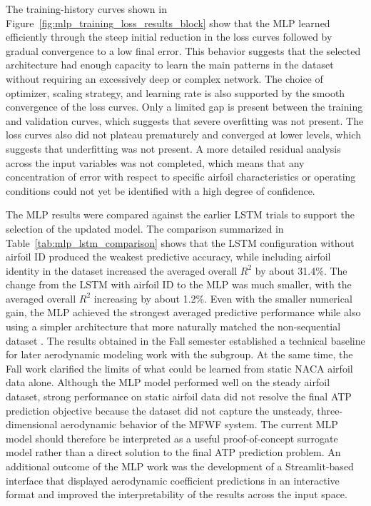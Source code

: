 The training-history curves shown in Figure~\ref{fig:mlp_training_loss_results_block} show that the MLP learned efficiently through the steep initial reduction in the loss curves followed by gradual convergence to a low final error. This behavior suggests that the selected architecture had enough capacity to learn the main patterns in the dataset without requiring an excessively deep or complex network. The choice of optimizer, scaling strategy, and learning rate is also supported by the smooth convergence of the loss curves. Only a limited gap is present between the training and validation curves, which suggests that severe overfitting was not present. The loss curves also did not plateau prematurely and converged at lower levels, which suggests that underfitting was not present. A more detailed residual analysis across the input variables was not completed, which means that any concentration of error with respect to specific airfoil characteristics or operating conditions could not yet be identified with a high degree of confidence.

The MLP results were compared against the earlier LSTM trials to support the selection of the updated model. The comparison summarized in Table~\ref{tab:mlp_lstm_comparison} shows that the LSTM configuration without airfoil ID produced the weakest predictive accuracy, while including airfoil identity in the dataset increased the averaged overall $R^2$ by about 31.4\%. The change from the LSTM with airfoil ID to the MLP was much smaller, with the averaged overall $R^2$ increasing by about 1.2\%. Even with the smaller numerical gain, the MLP achieved the strongest averaged predictive performance while also using a simpler architecture that more naturally matched the non-sequential dataset \cite{WadeProgressPresentation3_2025,WadeProgressPresentation4_2025,MLPMetricsJSON_2026}. The results obtained in the Fall semester established a technical baseline for later aerodynamic modeling work with the subgroup. At the same time, the Fall work clarified the limits of what could be learned from static NACA airfoil data alone. Although the MLP model performed well on the steady airfoil dataset, strong performance on static airfoil data did not resolve the final ATP prediction objective because the dataset did not capture the unsteady, three-dimensional aerodynamic behavior of the MFWF system. The current MLP model should therefore be interpreted as a useful proof-of-concept surrogate model rather than a direct solution to the final ATP prediction problem. An additional outcome of the MLP work was the development of a Streamlit-based interface that displayed aerodynamic coefficient predictions in an interactive format and improved the interpretability of the results across the input space.

